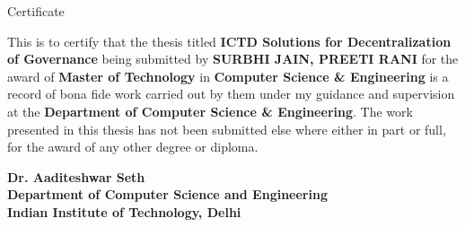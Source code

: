 \begin{center}
\LARGE{ Certificate} 
\end{center}

\vspace{0.5in}

This is to certify that the thesis titled {\bfseries ICTD Solutions for Decentralization of Governance} being submitted by
{\bfseries SURBHI JAIN, PREETI RANI} for the award of {\bfseries Master of Technology} in {\bfseries Computer Science \& Engineering} is a record of bona fide work carried out by them under my guidance and supervision at the {\bfseries Department of Computer Science \& Engineering}. The work presented in this thesis has not been submitted else where either in part or full, for the award of any other degree or diploma.

\vspace{1.5in}


{\bfseries Dr. Aaditeshwar Seth} \\
{\bfseries Department of Computer Science and Engineering} \\
{\bfseries Indian Institute of Technology, Delhi}\\ 
